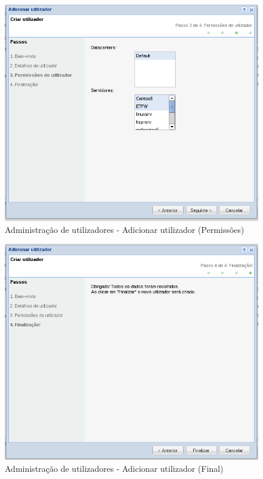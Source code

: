 {\begin{figure}[H]
        \begin{center}
        \includegraphics[scale=0.4]{screenshots/users/create_user_wiz_03.png}
        \caption{Administração de utilizadores - Adicionar utilizador (Permissões)}
        \label{fig:create_user_wiz_03}
        \end{center}
\end{figure}

\begin{figure}[H]
        \begin{center}
        \includegraphics[scale=0.4]{screenshots/users/create_user_wiz_04.png}
        \caption{Administração de utilizadores - Adicionar utilizador (Final)}
        \label{fig:create_user_wiz_04}
        \end{center}
\end{figure}
}

